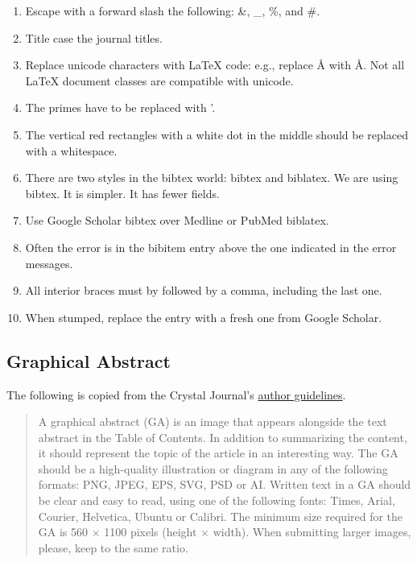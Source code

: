 \documentclass[11pt,letterpaper]{article}
\begin{document}
\begin{enumerate}
\item Escape with a forward slash the following: \&, \_, \%, and \#.
\item Title case the journal titles.
\item Replace unicode characters with \LaTeX{} code: e.g., replace Å with Å.
Not all \LaTeX{} document classes are compatible with unicode.
\item The primes have to be replaced with '.
\item The vertical red rectangles with a white dot in the middle should be
replaced with a whitespace.
\item There are two styles in the bibtex world: bibtex and biblatex. We are
using bibtex. It is simpler. It has fewer fields.
\item Use Google Scholar bibtex over Medline or PubMed biblatex.
\item Often the error is in the bibitem entry above the one indicated in
the error messages.
\item All interior braces must by followed by a comma, including the last
one.
\item When stumped, replace the entry with a fresh one from Google
Scholar.
\end{enumerate}


\subsection{Graphical Abstract}
\label{sec:org69785a2}

The following is copied from the Crystal Journal's
\href{https://www.mdpi.com/journal/crystals/instructions\#preparation}{author
guidelines}.

\begin{quote}
A graphical abstract (GA) is an image that appears alongside the text
abstract in the Table of Contents. In addition to summarizing the
content, it should represent the topic of the article in an interesting
way. The GA should be a high-quality illustration or diagram in any of
the following formats: PNG, JPEG, EPS, SVG, PSD or AI. Written text in a
GA should be clear and easy to read, using one of the following fonts:
Times, Arial, Courier, Helvetica, Ubuntu or Calibri. The minimum size
required for the GA is 560 \(\times\) 1100 pixels (height \(\times\)
width). When submitting larger images, please, keep to the same ratio.
\end{quote}
\end{document}
